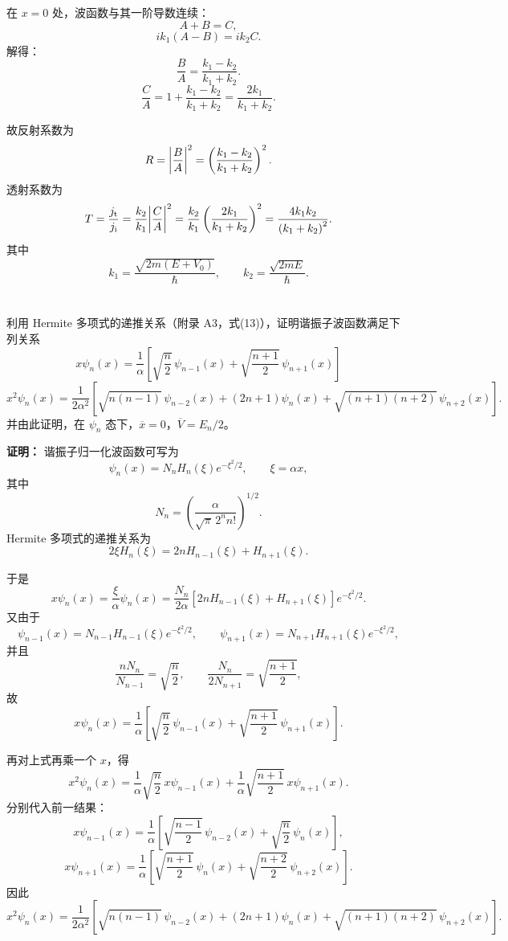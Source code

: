 \documentclass[12pt,a4paper]{article}
\begin{document}
在 \(x=0\) 处，波函数与其一阶导数连续：
\[
A+B=C,
\]
\[
ik_1\left(A-B\right)=ik_2C.
\]
解得：
\[
\frac{B}{A}=\frac{k_1-k_2}{k_1+k_2}.
\]
\[
\frac{C}{A}
=
1+\frac{k_1-k_2}{k_1+k_2}
=
\frac{2k_1}{k_1+k_2}.
\]

故反射系数为
\[
R=\abs{\frac{B}{A}}^2
=
\left(\frac{k_1-k_2}{k_1+k_2}\right)^2.
\]
透射系数为
\[
T=\frac{j_{\mathrm{t}}}{j_{\mathrm{i}}}
=\frac{k_2}{k_1}\abs{\frac{C}{A}}^2
=\frac{k_2}{k_1}\left(\frac{2k_1}{k_1+k_2}\right)^2
=\frac{4k_1k_2}{\left(k_1+k_2\right)^2}.
\]
其中
\[
k_1=\frac{\sqrt{2m\left(E+V_0\right)}}{\hbar},
\qquad
k_2=\frac{\sqrt{2mE}}{\hbar}.
\]

\section{}
利用 Hermite 多项式的递推关系（附录 A3，式(13)），证明谐振子波函数满足下列关系
\[
x\psi_n(x)=\frac{1}{\alpha}\left[\sqrt{\frac{n}{2}}\,\psi_{n-1}(x)+\sqrt{\frac{n+1}{2}}\,\psi_{n+1}(x)\right]
\]
\[
x^2\psi_n(x)=\frac{1}{2\alpha^2}\left[\sqrt{n(n-1)}\,\psi_{n-2}(x)+(2n+1)\psi_n(x)+\sqrt{(n+1)(n+2)}\,\psi_{n+2}(x)\right].
\]
并由此证明，在 $\psi_n$ 态下，$\overline{x}=0$，$\overline{V}=E_n/2$。

\vspace{0.5cm}

\noindent\textbf{证明：}
谐振子归一化波函数可写为
\[
\psi_n(x)=N_n H_n(\xi)e^{-\xi^2/2},
\qquad
\xi=\alpha x,
\]
其中
\[
N_n=\left(\frac{\alpha}{\sqrt{\pi}\,2^n n!}\right)^{1/2}.
\]
Hermite 多项式的递推关系为
\[
2\xi H_n(\xi)=2nH_{n-1}(\xi)+H_{n+1}(\xi).
\]

于是
\[
x\psi_n(x)=\frac{\xi}{\alpha}\psi_n(x)
=\frac{N_n}{2\alpha}\left[2nH_{n-1}(\xi)+H_{n+1}(\xi)\right]e^{-\xi^2/2}.
\]
又由于
\[
\psi_{n-1}(x)=N_{n-1}H_{n-1}(\xi)e^{-\xi^2/2},
\qquad
\psi_{n+1}(x)=N_{n+1}H_{n+1}(\xi)e^{-\xi^2/2},
\]
并且
\[
\frac{nN_n}{N_{n-1}}=\sqrt{\frac{n}{2}},
\qquad
\frac{N_n}{2N_{n+1}}=\sqrt{\frac{n+1}{2}},
\]
故
\[
x\psi_n(x)=\frac{1}{\alpha}\left[\sqrt{\frac{n}{2}}\,\psi_{n-1}(x)+\sqrt{\frac{n+1}{2}}\,\psi_{n+1}(x)\right].
\]

再对上式再乘一个 \(x\)，得
\[
x^2\psi_n(x)
=
\frac{1}{\alpha}\sqrt{\frac{n}{2}}\,x\psi_{n-1}(x)
+
\frac{1}{\alpha}\sqrt{\frac{n+1}{2}}\,x\psi_{n+1}(x).
\]
分别代入前一结果：
\[
x\psi_{n-1}(x)
=
\frac{1}{\alpha}\left[\sqrt{\frac{n-1}{2}}\,\psi_{n-2}(x)+\sqrt{\frac{n}{2}}\,\psi_n(x)\right],
\]
\[
x\psi_{n+1}(x)
=
\frac{1}{\alpha}\left[\sqrt{\frac{n+1}{2}}\,\psi_n(x)+\sqrt{\frac{n+2}{2}}\,\psi_{n+2}(x)\right].
\]
因此
\[
x^2\psi_n(x)=\frac{1}{2\alpha^2}\left[\sqrt{n(n-1)}\,\psi_{n-2}(x)+(2n+1)\psi_n(x)+\sqrt{(n+1)(n+2)}\,\psi_{n+2}(x)\right].
\]
\end{document}
